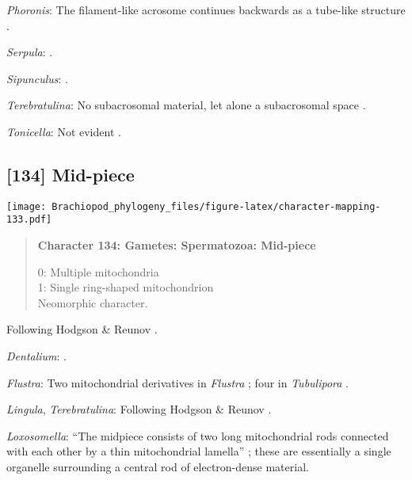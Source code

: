 \documentclass[openany]{book}
\theoremstyle{definition}
\theoremstyle{definition}
\theoremstyle{definition}
\theoremstyle{remark}
\begin{document}
\hypertarget{Phoronis-coding-133}{}
\emph{Phoronis}: The filament-like acrosome continues backwards as a
tube-like structure \citep[summarized in
\citet{Jamieson1991FishEvolution}]{Franzen1980Ultrastructureof}.

\hypertarget{Serpula-coding-133}{}
\emph{Serpula}: \citet{Gherardi2011}.

\hypertarget{Sipunculus-coding-133}{}
\emph{Sipunculus}: \citet{Rice1993}.

\hypertarget{Terebratulina-coding-133}{}
\emph{Terebratulina}: No subacrosomal material, let alone a subacrosomal
space \citep[e.g.][]{Hodgson1994Ultrastructureof}.

\hypertarget{Tonicella-coding-133}{}
\emph{Tonicella}: Not evident \citep{BucklandNicks1988}.

\subsection*{{[}134{]} Mid-piece}\label{mid-piece}

\texttt{[image: Brachiopod\_phylogeny\_files/figure-latex/character-mapping-133.pdf]}

\begin{quote}
\textbf{Character 134: Gametes: Spermatozoa: Mid-piece}

0: Multiple mitochondria\\
1: Single ring-shaped mitochondrion\\
Neomorphic character.
\end{quote}

Following Hodgson \& Reunov \citeyearpar{Hodgson1994Ultrastructureof}.

\hypertarget{Dentalium-coding-134}{}
\emph{Dentalium}: \citet{DufresneDube1983}.

\hypertarget{Flustra-coding-134}{}
\emph{Flustra}: Two mitochondrial derivatives in \emph{Flustra}
\citep{Franzen1981, Franzen2013}; four in \emph{Tubulipora}
\citep{Franzen1984}.

\hypertarget{Lingula-coding-134}{}
\emph{Lingula}, \emph{Terebratulina}: Following Hodgson \& Reunov
\citeyearpar{Hodgson1994Ultrastructureof}.

\hypertarget{Loxosomella-coding-134}{}
\emph{Loxosomella}: ``The midpiece consists of two long mitochondrial
rods connected with each other by a thin mitochondrial lamella''
\citep[in \emph{Loxosoma}]{Franzen2000}; these are essentially a single
organelle surrounding a central rod of electron-dense material.
\end{document}
